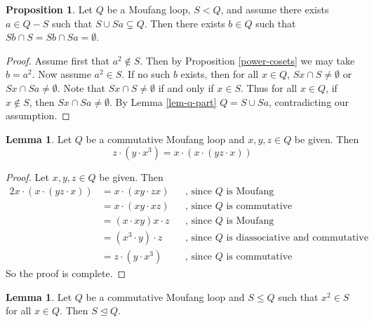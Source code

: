 \documentclass[12pt, twoside, openright]{report}
\theoremstyle{definition}
\newtheorem{lem}[thm]{Lemma}
\newtheorem{prp}[thm]{Proposition}
\begin{document}
\begin{prp}
  Let $Q$ be a Moufang loop, $S < Q$, and assume there exists $a\in Q- S$ such that
    $S\cup Sa \subsetneq Q$. Then there exists $b\in Q$ such that $Sb\cap S = Sb\cap Sa = \emptyset$.
\end{prp}

\begin{proof}
  Assume first that $a^2\not\in S$. Then by Proposition \ref{power-cosets} we may take $b=a^2$.
    Now assume $a^2\in S$. If no such $b$ exists, then for all $x\in Q$, $Sx\cap S \neq \emptyset$
    or $Sx\cap Sa \neq \emptyset$. Note that $Sx\cap S\neq\emptyset$ if and only if $x\in S$. Thus
    for all $x\in Q$, if $x\not\in S$, then $Sx\cap Sa\neq\emptyset$. By Lemma
    \ref{lem-q-part} $Q = S\cup Sa$, contradicting our assumption.
\end{proof}

\begin{lem}\label{lem-technical-1}
  Let $Q$ be a commutative Moufang loop and $x, y, z\in Q$ be given. Then 
  \[z\cdot(y\cdot x^3) = x\cdot(x\cdot(yz\cdot x))\]
\end{lem}

\begin{proof}
  Let $x, y, z\in Q$ be given. Then
  \begin{alignat*}{2}
    x\cdot (x\cdot (yz\cdot x)) &= x\cdot (xy\cdot zx) &&\text{, since $Q$ is Moufang}\\
    &= x\cdot(xy\cdot xz)   &&\text{, since $Q$ is commutative}\\
    &= (x\cdot xy)x\cdot z  &&\text{, since $Q$ is Moufang}\\
    &= (x^3\cdot y)\cdot z  &&\text{, since $Q$ is diassociative and commutative}\\
    &= z\cdot (y\cdot x^3)  &&\text{, since $Q$ is commutative}
  \end{alignat*}
  So the proof is complete.
\end{proof}

\begin{lem}\label{lem-squaresNormal}
  Let $Q$ be a commutative Moufang loop and $S\leq Q$ such that $x^2\in S$ for all $x\in Q$. Then $S\unlhd Q$.
\end{lem}
\end{document}
